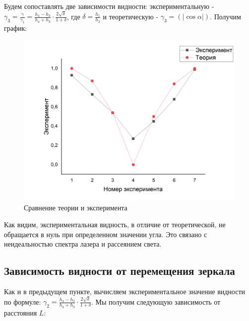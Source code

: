 \documentclass[a4paper,12pt]{article}
\begin{document}
Будем сопоставлять две зависимости видности: экспериментальную - $\gamma_3 = \frac{\gamma}{\gamma_1} =  \frac{h_4-h_3}{h_4+h_3} \cdot \frac{2\sqrt{\delta}}{1+\delta} $, где $\delta = \frac{h_1}{h_2}$ и теоретическую - $\gamma_3 = \left(|\cos{\alpha}|\right)$. Получим график: 
\begin{figure}[h!]
	\begin{center}
		\includegraphics[scale = 0.32]{2.png}
		\caption{Сравнение теории и эксперимента}
		\label{p1}
	\end{center}
\end{figure}
\newpage
Как видим, экспериментальная видность, в отличие от теоретической, не обращается в нуль при определенном значении угла. Это связано с неидеальностью спектра лазера и рассеянием света.

\subsection{Зависимость видности от перемещения зеркала}

Как и в предыдущем пункте, вычисляем экспериментальное значение видности по формуле: $\gamma_2 =  \frac{h_4-h_3}{h_4+h_3} \cdot \frac{2\sqrt{\delta}}{1+\delta} $. Мы получим следующую зависимость от расстояния $L$:
\end{document}
